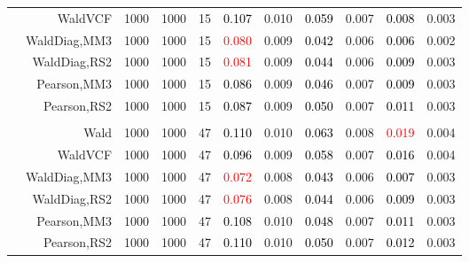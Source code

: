 \documentclass[
]{article}
\begin{document}
\begin{table}[H]
{\begin{tabular}[t]{lrrrrrrrlrr}
\hspace{1em} & WaldVCF & 1000 & 1000 & 15 & \textcolor{black}{0.107} & 0.010 & \textcolor{black}{0.059} & 0.007 & \textcolor{black}{0.008} & 0.003\\

\hspace{1em} & WaldDiag,MM3 & 1000 & 1000 & 15 & \textcolor{red}{0.080} & 0.009 & \textcolor{black}{0.042} & 0.006 & \textcolor{black}{0.006} & 0.002\\

\hspace{1em} & WaldDiag,RS2 & 1000 & 1000 & 15 & \textcolor{red}{0.081} & 0.009 & \textcolor{black}{0.044} & 0.006 & \textcolor{black}{0.009} & 0.003\\

\hspace{1em} & Pearson,MM3 & 1000 & 1000 & 15 & \textcolor{black}{0.086} & 0.009 & \textcolor{black}{0.046} & 0.007 & \textcolor{black}{0.009} & 0.003\\

\hspace{1em} & Pearson,RS2 & 1000 & 1000 & 15 & \textcolor{black}{0.087} & 0.009 & \textcolor{black}{0.050} & 0.007 & \textcolor{black}{0.011} & 0.003\\
\cmidrule{1-11}
\addlinespace[0.3em]
\multicolumn{11}{l}{\textbf{3F 15V}}\\
\hspace{1em} & Wald & 1000 & 1000 & 47 & \textcolor{black}{0.110} & 0.010 & \textcolor{black}{0.063} & 0.008 & \textcolor{red}{0.019} & 0.004\\

\hspace{1em} & WaldVCF & 1000 & 1000 & 47 & \textcolor{black}{0.096} & 0.009 & \textcolor{black}{0.058} & 0.007 & \textcolor{black}{0.016} & 0.004\\

\hspace{1em} & WaldDiag,MM3 & 1000 & 1000 & 47 & \textcolor{red}{0.072} & 0.008 & \textcolor{black}{0.043} & 0.006 & \textcolor{black}{0.007} & 0.003\\

\hspace{1em} & WaldDiag,RS2 & 1000 & 1000 & 47 & \textcolor{red}{0.076} & 0.008 & \textcolor{black}{0.044} & 0.006 & \textcolor{black}{0.009} & 0.003\\

\hspace{1em} & Pearson,MM3 & 1000 & 1000 & 47 & \textcolor{black}{0.108} & 0.010 & \textcolor{black}{0.048} & 0.007 & \textcolor{black}{0.011} & 0.003\\

\hspace{1em} & Pearson,RS2 & 1000 & 1000 & 47 & \textcolor{black}{0.110} & 0.010 & \textcolor{black}{0.050} & 0.007 & \textcolor{black}{0.012} & 0.003\\
\bottomrule
\end{tabular}}
\endgroup{}
\end{table}
\end{document}
